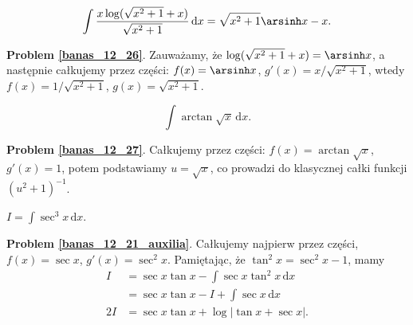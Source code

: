 \begin{problem_with_solution}
    \label{banas_12_26}%
    \begin{equation}
        \int \frac{x \log(\sqrt{x^2+1}+x)}{\sqrt{x^2+1}} \,\mathrm{d}x = \sqrt{x^2+1} \arsinh x - x.
    \end{equation}
\end{problem_with_solution}

\textbf{Problem \ref{banas_12_26}}.
Zauważamy, że $\log(\sqrt{x^2+1} + x) = \arsinh x$, a następnie całkujemy przez części: $f(x) = \arsinh x$, $g'(x) = x / \sqrt{x^2+1}$, wtedy $f(x) = 1/\sqrt{x^2+1}$, $g(x) = \sqrt{x^2+1}$.

\begin{problem_with_solution}
    \label{banas_12_27}%
    \begin{equation}
        \int \arctan \sqrt{x} \,\mathrm{d}x.
    \end{equation}
\end{problem_with_solution}

\textbf{Problem \ref{banas_12_27}}.
Całkujemy przez części: $f(x) = \arctan \sqrt x$, $g'(x) = 1$, potem podstawiamy $u = \sqrt{x}$, co prowadzi do klasycznej całki funkcji $(u^2 + 1)^{-1}$.

\begin{problem_with_solution}
    \label{banas_12_21_auxilia}%
    $I = \int \sec^3 x \,\mathrm{d}x$.
\end{problem_with_solution}

\textbf{Problem \ref{banas_12_21_auxilia}}.
Całkujemy najpierw przez części, $f(x) = \sec x$, $g'(x) = \sec^2 x$.
Pamiętając, że $\tan^2 x = \sec^2 x - 1$, mamy
\begin{align}
    I & = \sec x \tan x - \int \sec x \tan^2 x \,\mathrm{d} x \\
        & = \sec x \tan x - I + \int \sec x \,\mathrm{d}x \\
    2I & = \sec x \tan x + \log |\tan x + \sec x|.
\end{align}
